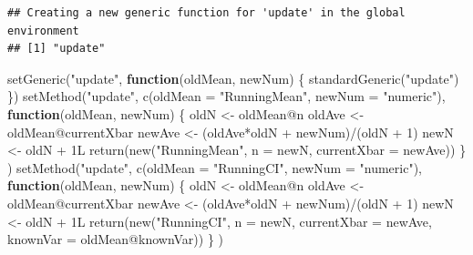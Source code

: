 \documentclass[
  12pt,
  krantz2]{krantz}
\makeatletter
\newenvironment{Shaded}{\begin{snugshade}}{\end{snugshade}}
\newcommand{\AttributeTok}[1]{\textcolor[rgb]{0.61,0.61,0.61}{#1}}
\newcommand{\ControlFlowTok}[1]{\textcolor[rgb]{0.27,0.27,0.27}{\textbf{#1}}}
\newcommand{\DecValTok}[1]{\textcolor[rgb]{0.06,0.06,0.06}{#1}}
\newcommand{\FunctionTok}[1]{\textcolor[rgb]{0,0,0}{#1}}
\newcommand{\NormalTok}[1]{#1}
\newcommand{\OtherTok}[1]{\textcolor[rgb]{0.37,0.37,0.37}{#1}}
\newcommand{\SpecialCharTok}[1]{\textcolor[rgb]{0,0,0}{#1}}
\newcommand{\StringTok}[1]{\textcolor[rgb]{0.5,0.5,0.5}{#1}}
\newenvironment{kframe}{%
\medskip{}
\setlength{\fboxsep}{.8em}
 \def\at@end@of@kframe{}%
 \ifinner\ifhmode%
  \def\at@end@of@kframe{\end{minipage}}%
  \begin{minipage}{\columnwidth}%
 \fi\fi%
 \def\FrameCommand##1{\hskip\@totalleftmargin \hskip-\fboxsep
 \colorbox{shadecolor}{##1}\hskip-\fboxsep
     \hskip-\linewidth \hskip-\@totalleftmargin \hskip\columnwidth}%
 \MakeFramed {\advance\hsize-\width
   \@totalleftmargin\z@ \linewidth\hsize
   \@setminipage}}%
 {\par\unskip\endMakeFramed%
 \at@end@of@kframe}
\renewenvironment{Shaded}{\begin{kframe}}{\end{kframe}}
\makeatother
\begin{document}
\begin{verbatim}
## Creating a new generic function for 'update' in the global environment
## [1] "update"
\end{verbatim}

\begin{Shaded}
\begin{Highlighting}[]
\FunctionTok{setGeneric}\NormalTok{(}\StringTok{"update"}\NormalTok{, }\ControlFlowTok{function}\NormalTok{(oldMean, newNum) \{}
  \FunctionTok{standardGeneric}\NormalTok{(}\StringTok{"update"}\NormalTok{)}
\NormalTok{\})}
\FunctionTok{setMethod}\NormalTok{(}\StringTok{"update"}\NormalTok{,}
          \FunctionTok{c}\NormalTok{(}\AttributeTok{oldMean =} \StringTok{"RunningMean"}\NormalTok{, }\AttributeTok{newNum =} \StringTok{"numeric"}\NormalTok{),}
          \ControlFlowTok{function}\NormalTok{(oldMean, newNum) \{}
\NormalTok{            oldN }\OtherTok{\textless{}{-}}\NormalTok{ oldMean}\SpecialCharTok{@}\NormalTok{n}
\NormalTok{            oldAve }\OtherTok{\textless{}{-}}\NormalTok{ oldMean}\SpecialCharTok{@}\NormalTok{currentXbar}
\NormalTok{            newAve }\OtherTok{\textless{}{-}}\NormalTok{ (oldAve}\SpecialCharTok{*}\NormalTok{oldN }\SpecialCharTok{+}\NormalTok{ newNum)}\SpecialCharTok{/}\NormalTok{(oldN }\SpecialCharTok{+} \DecValTok{1}\NormalTok{)}
\NormalTok{            newN }\OtherTok{\textless{}{-}}\NormalTok{ oldN }\SpecialCharTok{+}\NormalTok{ 1L}
            \FunctionTok{return}\NormalTok{(}\FunctionTok{new}\NormalTok{(}\StringTok{"RunningMean"}\NormalTok{, }\AttributeTok{n =}\NormalTok{ newN, }\AttributeTok{currentXbar =}\NormalTok{ newAve))}
\NormalTok{          \}}
\NormalTok{)}
\FunctionTok{setMethod}\NormalTok{(}\StringTok{"update"}\NormalTok{,}
          \FunctionTok{c}\NormalTok{(}\AttributeTok{oldMean =} \StringTok{"RunningCI"}\NormalTok{, }\AttributeTok{newNum =} \StringTok{"numeric"}\NormalTok{),}
          \ControlFlowTok{function}\NormalTok{(oldMean, newNum) \{}
\NormalTok{            oldN }\OtherTok{\textless{}{-}}\NormalTok{ oldMean}\SpecialCharTok{@}\NormalTok{n}
\NormalTok{            oldAve }\OtherTok{\textless{}{-}}\NormalTok{ oldMean}\SpecialCharTok{@}\NormalTok{currentXbar}
\NormalTok{            newAve }\OtherTok{\textless{}{-}}\NormalTok{ (oldAve}\SpecialCharTok{*}\NormalTok{oldN }\SpecialCharTok{+}\NormalTok{ newNum)}\SpecialCharTok{/}\NormalTok{(oldN }\SpecialCharTok{+} \DecValTok{1}\NormalTok{)}
\NormalTok{            newN }\OtherTok{\textless{}{-}}\NormalTok{ oldN }\SpecialCharTok{+}\NormalTok{ 1L}
            \FunctionTok{return}\NormalTok{(}\FunctionTok{new}\NormalTok{(}\StringTok{"RunningCI"}\NormalTok{, }\AttributeTok{n =}\NormalTok{ newN, }\AttributeTok{currentXbar =}\NormalTok{ newAve, }
                       \AttributeTok{knownVar =}\NormalTok{ oldMean}\SpecialCharTok{@}\NormalTok{knownVar))}
\NormalTok{          \}}
\NormalTok{)}
\end{Highlighting}
\end{Shaded}
\end{document}
